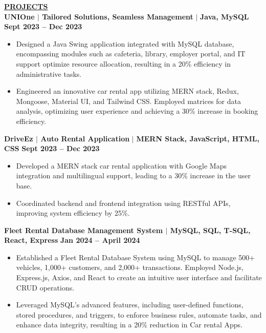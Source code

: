 \documentclass{article}
\begin{document}
\noindent \textbf{\underline{PROJECTS}} \\
\textbf{\textbf{UNIOne } $\mid$ Tailored Solutions, Seamless Management} $\mid$ \textbf{Java, MySQL} \hfill {\textbf{\textbf{Sept 2023 – Dec 2023} }}
\begin{itemize}[noitemsep,nolistsep,leftmargin=*]
    \item Designed a Java Swing application integrated with MySQL database, encompassing modules such as cafeteria, library, employer portal, and IT support optimize resource allocation, resulting in a 20\% efficiency in administrative tasks.
\item Engineered an innovative car rental app utilizing MERN stack, Redux, Mongoose, Material UI, and Tailwind CSS. Employed matrices for data analysis, optimizing user experience and achieving a 30\% increase in booking efficiency.

\end{itemize}
\textbf{\textbf{DriveEz } $\mid$ Auto Rental Application} $\mid$ \textbf{MERN Stack, JavaScript, HTML, CSS}  \hfill \textbf{\textbf{Sept 2023 – Dec 2023}}
\begin{itemize}[noitemsep,nolistsep,leftmargin=*]
    \item Developed a MERN stack car rental application with Google Maps integration and multilingual support, leading to a 30\% increase in the user base.
    \item Coordinated backend and frontend integration using RESTful APIs, improving system efficiency by 25\%.

\end{itemize}
\textbf{\textbf{Fleet Rental Database Management System } $\mid$ \textbf{MySQL, SQL, T-SQL, React, Express} } \hfill \textbf{\textbf{Jan 2024 – April 2024} }
\begin{itemize}[noitemsep,nolistsep,leftmargin=*]
    \item Established a Fleet Rental Database System using MySQL to manage 500+ vehicles, 1,000+ customers, and 2,000+ transactions. Employed Node.js, Express.js, Axios, and React to create an intuitive user interface and facilitate CRUD operations.
    \item Leveraged MySQL's advanced features, including user-defined functions, stored procedures, and triggers, to enforce business rules, automate tasks, and enhance data integrity, resulting in a 20\% reduction in Car rental Apps.
\end{itemize}
\end{document}
